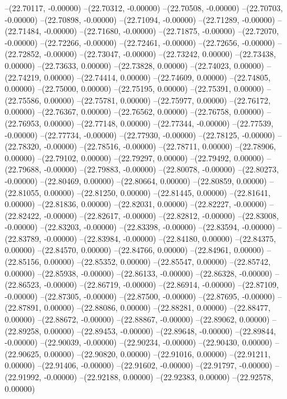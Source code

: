 --(22.70117, -0.00000)
--(22.70312, -0.00000)
--(22.70508, -0.00000)
--(22.70703, -0.00000)
--(22.70898, -0.00000)
--(22.71094, -0.00000)
--(22.71289, -0.00000)
--(22.71484, -0.00000)
--(22.71680, -0.00000)
--(22.71875, -0.00000)
--(22.72070, -0.00000)
--(22.72266, -0.00000)
--(22.72461, -0.00000)
--(22.72656, -0.00000)
--(22.72852, -0.00000)
--(22.73047, -0.00000)
--(22.73242, 0.00000)
--(22.73438, 0.00000)
--(22.73633, 0.00000)
--(22.73828, 0.00000)
--(22.74023, 0.00000)
--(22.74219, 0.00000)
--(22.74414, 0.00000)
--(22.74609, 0.00000)
--(22.74805, 0.00000)
--(22.75000, 0.00000)
--(22.75195, 0.00000)
--(22.75391, 0.00000)
--(22.75586, 0.00000)
--(22.75781, 0.00000)
--(22.75977, 0.00000)
--(22.76172, 0.00000)
--(22.76367, 0.00000)
--(22.76562, 0.00000)
--(22.76758, 0.00000)
--(22.76953, 0.00000)
--(22.77148, 0.00000)
--(22.77344, -0.00000)
--(22.77539, -0.00000)
--(22.77734, -0.00000)
--(22.77930, -0.00000)
--(22.78125, -0.00000)
--(22.78320, -0.00000)
--(22.78516, -0.00000)
--(22.78711, 0.00000)
--(22.78906, 0.00000)
--(22.79102, 0.00000)
--(22.79297, 0.00000)
--(22.79492, 0.00000)
--(22.79688, -0.00000)
--(22.79883, -0.00000)
--(22.80078, -0.00000)
--(22.80273, -0.00000)
--(22.80469, 0.00000)
--(22.80664, 0.00000)
--(22.80859, 0.00000)
--(22.81055, 0.00000)
--(22.81250, 0.00000)
--(22.81445, 0.00000)
--(22.81641, 0.00000)
--(22.81836, 0.00000)
--(22.82031, 0.00000)
--(22.82227, -0.00000)
--(22.82422, -0.00000)
--(22.82617, -0.00000)
--(22.82812, -0.00000)
--(22.83008, -0.00000)
--(22.83203, -0.00000)
--(22.83398, -0.00000)
--(22.83594, -0.00000)
--(22.83789, -0.00000)
--(22.83984, -0.00000)
--(22.84180, 0.00000)
--(22.84375, 0.00000)
--(22.84570, 0.00000)
--(22.84766, 0.00000)
--(22.84961, 0.00000)
--(22.85156, 0.00000)
--(22.85352, 0.00000)
--(22.85547, 0.00000)
--(22.85742, 0.00000)
--(22.85938, -0.00000)
--(22.86133, -0.00000)
--(22.86328, -0.00000)
--(22.86523, -0.00000)
--(22.86719, -0.00000)
--(22.86914, -0.00000)
--(22.87109, -0.00000)
--(22.87305, -0.00000)
--(22.87500, -0.00000)
--(22.87695, -0.00000)
--(22.87891, 0.00000)
--(22.88086, 0.00000)
--(22.88281, 0.00000)
--(22.88477, 0.00000)
--(22.88672, -0.00000)
--(22.88867, -0.00000)
--(22.89062, 0.00000)
--(22.89258, 0.00000)
--(22.89453, -0.00000)
--(22.89648, -0.00000)
--(22.89844, -0.00000)
--(22.90039, -0.00000)
--(22.90234, -0.00000)
--(22.90430, 0.00000)
--(22.90625, 0.00000)
--(22.90820, 0.00000)
--(22.91016, 0.00000)
--(22.91211, 0.00000)
--(22.91406, -0.00000)
--(22.91602, -0.00000)
--(22.91797, -0.00000)
--(22.91992, -0.00000)
--(22.92188, 0.00000)
--(22.92383, 0.00000)
--(22.92578, 0.00000)
